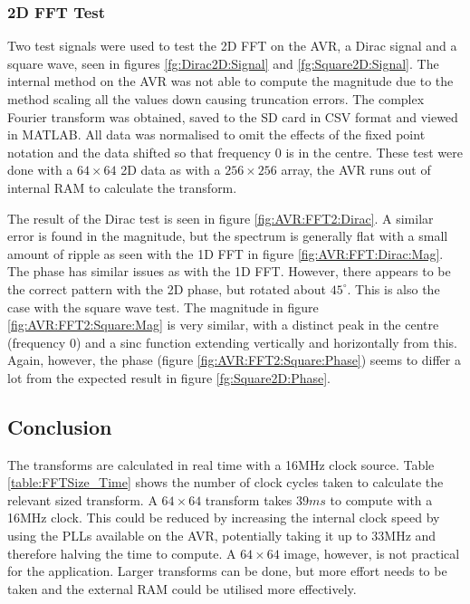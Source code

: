 \subsubsection{2D FFT Test}

Two test signals were used to test the 2D FFT on the AVR, a Dirac signal and a square wave, seen in figures \ref{fg:Dirac2D:Signal} and \ref{fg:Square2D:Signal}. The internal method on the AVR was not able to compute the magnitude due to the method scaling all the values down causing truncation errors. The complex Fourier transform was obtained, saved to the SD card in CSV format and viewed in MATLAB. All data was normalised to omit the effects of the fixed point notation and the data shifted so that frequency 0 is in the centre. These test were done with a $64\times64$ 2D data as with a $256 \times 256$ array, the AVR runs out of internal RAM to calculate the transform. 

The result of the Dirac test is seen in figure \ref{fig:AVR:FFT2:Dirac}. A similar error is found in the magnitude, but the spectrum is generally flat with a small amount of ripple as seen with the 1D FFT in figure \ref{fig:AVR:FFT:Dirac:Mag}. The phase has similar issues as with the 1D FFT. However, there appears to be the correct pattern with the 2D phase, but rotated about $45^{\circ}$. This is also the case with the square wave test. The magnitude in figure \ref{fig:AVR:FFT2:Square:Mag} is very similar, with a distinct peak in the centre (frequency 0) and a sinc function extending vertically and horizontally from this. Again, however, the phase (figure \ref{fig:AVR:FFT2:Square:Phase}) seems to differ a lot from the expected result in figure \ref{fg:Square2D:Phase}. 

\subsection{Conclusion}
The transforms are calculated in real time with a 16MHz clock source. Table \ref{table:FFTSize_Time} shows the number of clock cycles taken to calculate the relevant sized transform. A $64 \times 64$ transform takes $39ms$ to compute with a 16MHz clock. This could be reduced by increasing the internal clock speed by using the PLLs available on the AVR, potentially taking it up to 33MHz and therefore halving the time to compute. A $64 \times 64$ image, however, is not practical for the application. Larger transforms can be done, but more effort needs to be taken and the external RAM could be utilised more effectively.

